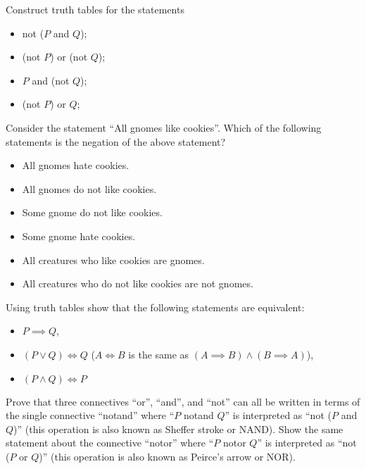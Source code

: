 \begin{chapterendexercises}
  \exercise Construct truth tables for the statements
    \begin{itemize}
      \item not ($P$ and $Q$);
      \item (not $P$) or (not $Q$);
      \item $P$ and (not $Q$);
      \item (not $P$) or $Q$;
    \end{itemize}
  \exercise[recommended] Consider the statement ``All gnomes like cookies''. Which of
    the following statements is the negation of the above statement?
    \begin{itemize}
      \item All gnomes hate cookies.
      \item All gnomes do not like cookies.
      \item Some gnome do not like cookies.
      \item Some gnome hate cookies.
      \item All creatures who like cookies are gnomes.
      \item All creatures who do not like cookies are not gnomes.
    \end{itemize}
  \exercise Using truth tables show that the following statements are
    equivalent:
    \begin{itemize}
      \item $P \implies Q$,
      \item $(P \lor Q) \iff Q$
        ($A \iff B$ is the same as $(A \implies B) \land (B \implies A)$),
      \item $(P \land Q) \iff P$
    \end{itemize}
  \exercise Prove that three connectives ``or'', ``and'', and ``not'' can
    all be written in terms of the single connective ``notand'' where ``$P$
    notand $Q$'' is interpreted as ``not ($P$ and $Q$)'' (this operation is
    also known as Sheffer stroke or NAND).
  \exercise Show the same statement about the connective ``notor'' where
    ``$P$ notor $Q$'' is interpreted as ``not ($P$ or $Q$)'' (this operation is
    also known as Peirce's arrow or NOR).
\end{chapterendexercises}

